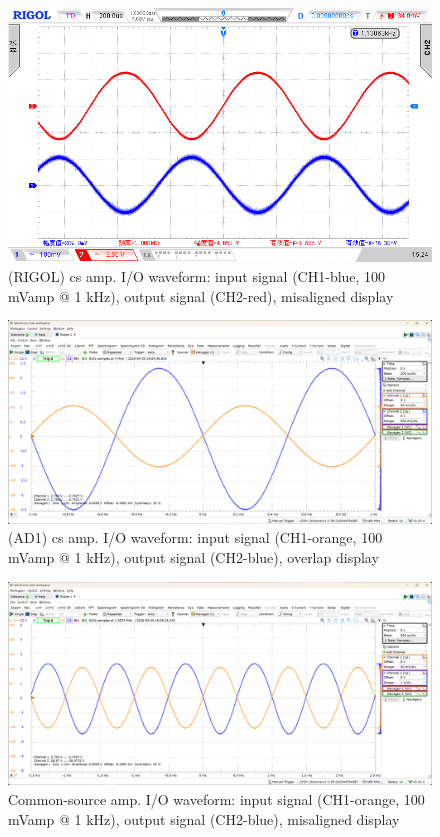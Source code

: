 \documentclass[UTF8]{article}
\begin{document}
\begin{figure}[H]\centering
    \includegraphics[width=\columnwidth]{LCE-04-场效应管/assets/cs amp/CS 输入输出波形 RIGOL (2).png}
    \caption{(RIGOL) cs amp. I/O waveform: input signal (CH1-blue, 100 mVamp @ 1 kHz), output signal (CH2-red), misaligned display}
\end{figure}

\begin{figure}[H]\centering
    \includegraphics[width=\columnwidth]{LCE-04-场效应管/assets/cs amp/CS 输入输出波形.png}
    \caption{(AD1) cs amp. I/O waveform: input signal (CH1-orange, 100 mVamp @ 1 kHz), output signal (CH2-blue), overlap display}
\end{figure}

\begin{figure}[H]\centering
    \includegraphics[width=\columnwidth]{LCE-04-场效应管/assets/cs amp/CS 输入输出波形 (2).png}
    \caption{Common-source amp. I/O waveform: input signal (CH1-orange, 100 mVamp @ 1 kHz), output signal (CH2-blue), misaligned display}
\end{figure}
\end{document}
